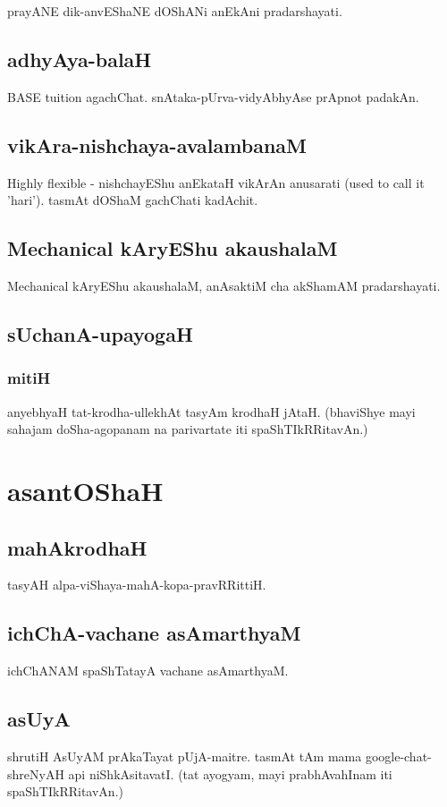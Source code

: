 \documentclass[oneside, article]{memoir}
\begin{document}
prayANE dik-anvEShaNE dOShANi anEkAni pradarshayati.

\subsection{adhyAya-balaH}
BASE tuition agachChat. snAtaka-pUrva-vidyAbhyAse prApnot padakAn.

\subsection{vikAra-nishchaya-avalambanaM}
Highly flexible - nishchayEShu anEkataH vikArAn anusarati (used to call it 'hari'). tasmAt dOShaM gachChati kadAchit.

\subsection{Mechanical kAryEShu akaushalaM}
Mechanical kAryEShu akaushalaM, anAsaktiM cha akShamAM pradarshayati.

\subsection{sUchanA-upayogaH}
\subsubsection{mitiH}
anyebhyaH tat-krodha-ullekhAt tasyAm krodhaH jAtaH. (bhaviShye mayi sahajam doSha-agopanam na parivartate iti spaShTIkRRitavAn.)

\section{asantOShaH}
\subsection{mahAkrodhaH}
tasyAH alpa-viShaya-mahA-kopa-pravRRittiH.

\subsection{ichChA-vachane asAmarthyaM}
ichChANAM spaShTatayA vachane asAmarthyaM.

\subsection{asUyA}
shrutiH AsUyAM prAkaTayat pUjA-maitre. tasmAt tAm mama google-chat-shreNyAH api niShkAsitavatI. (tat ayogyam, mayi prabhAvahInam iti spaShTIkRRitavAn.)
\end{document}

